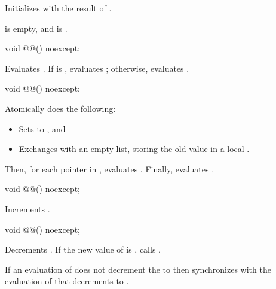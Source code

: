 \begin{itemdescr}
\pnum
\effects
Initializes  with the result of
.

\pnum
\ensures
{} is empty, and  is .
\end{itemdescr}

\begin{itemdecl}
void @@() noexcept;
\end{itemdecl}

\begin{itemdescr}
\pnum
\effects
Evaluates .
If  is ,
evaluates ;
otherwise, evaluates .
\end{itemdescr}

\begin{itemdecl}
void @@() noexcept;
\end{itemdecl}

\begin{itemdescr}
\pnum
\effects
Atomically does the following:
\begin{itemize}
\item
Sets  to , and
\item
Exchanges  with an empty list,
storing the old value in a local .
\end{itemize}
Then, for each pointer  in ,
evaluates .
Finally, evaluates .
\end{itemdescr}

\begin{itemdecl}
void @@() noexcept;
\end{itemdecl}

\begin{itemdescr}
\pnum
\effects
Increments .
\end{itemdescr}

\begin{itemdecl}
void @@() noexcept;
\end{itemdecl}

\begin{itemdescr}
\pnum
\effects
Decrements .
If the new value of  is ,
calls .

\pnum
\sync
If an evaluation of  does not
decrement the  to  then
synchronizes with the evaluation of 
that decrements  to .
\end{itemdescr}

